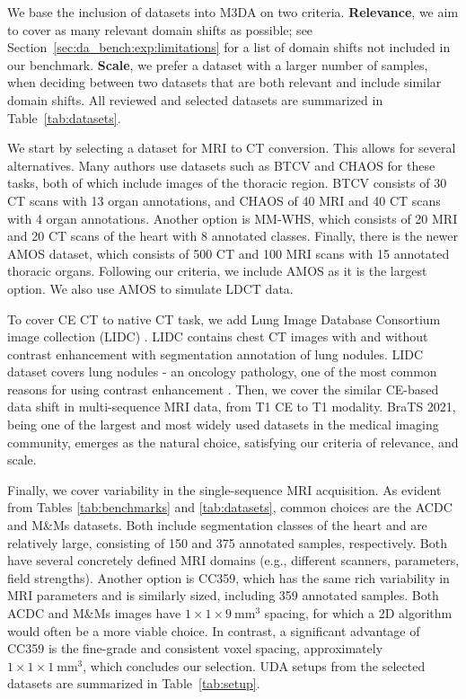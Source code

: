 We base the inclusion of datasets into M3DA on two criteria. \textbf{Relevance}, we aim to cover as many relevant domain shifts as possible; see Section~\ref{sec:da_bench:exp:limitations} for a list of domain shifts not included in our benchmark. \textbf{Scale}, we prefer a dataset with a larger number of samples, when deciding between two datasets that are both relevant and include similar domain shifts. All reviewed and selected datasets are summarized in Table~\ref{tab:datasets}.%



We start by selecting a dataset for MRI to CT conversion. This allows for several alternatives. Many authors use datasets such as BTCV and CHAOS for these tasks, both of which include images of the thoracic region. BTCV consists of 30 CT scans with 13 organ annotations, and CHAOS of 40 MRI and 40 CT scans with 4 organ annotations. Another option is MM-WHS, which consists of 20 MRI and 20 CT scans of the heart with 8 annotated classes. Finally, there is the newer AMOS dataset, which consists of 500 CT and 100 MRI scans with 15 annotated thoracic organs. Following our criteria, we include AMOS as it is the largest option. We also use AMOS to simulate LDCT data.

To cover CE CT to native CT task, we add Lung Image Database Consortium image collection (LIDC) \cite{lidc}. LIDC contains chest CT images with and without contrast enhancement with segmentation annotation of lung nodules. LIDC dataset covers lung nodules - an oncology pathology, one of the most common reasons for using contrast enhancement \cite{purysko2016does}. Then, we cover the similar CE-based data shift in multi-sequence MRI data, from T1 CE to T1 modality. BraTS 2021, being one of the largest and most widely used datasets in the medical imaging community, emerges as the natural choice, satisfying our criteria of relevance, and scale.

Finally, we cover variability in the single-sequence MRI acquisition. As evident from Tables \ref{tab:benchmarks} and \ref{tab:datasets}, common choices are the ACDC and M\&Ms datasets. Both include segmentation classes of the heart and are relatively large, consisting of 150 and 375 annotated samples, respectively. Both have several concretely defined MRI domains (e.g., different scanners, parameters, field strengths). Another option is CC359, which has the same rich variability in MRI parameters and is similarly sized, including 359 annotated samples. Both ACDC and M\&Ms images have $1\times 1\times 9~ \text{mm}^3$ spacing, for which a 2D algorithm would often be a more viable choice. In contrast, a significant advantage of CC359 is the fine-grade and consistent voxel spacing, approximately $1\times 1\times 1~ \text{mm}^3$, which concludes our selection. UDA setups from the selected datasets are summarized in Table~\ref{tab:setup}.

